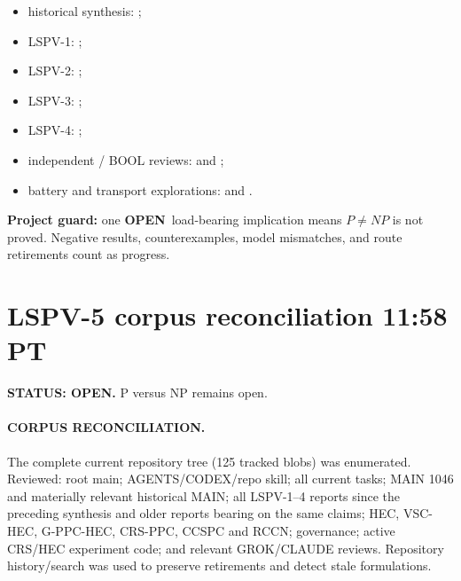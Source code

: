 \documentclass[11pt]{article}
\newcommand{\statusopen}{\textcolor{openstatus}{\textbf{OPEN}}}
\begin{document}
\begin{itemize}
  \item historical synthesis:
    ;
  \item LSPV-1:
    ;
  \item LSPV-2:
    ;
  \item LSPV-3:
    ;
  \item LSPV-4:
    ;
  \item independent / BOOL reviews:
     and ;
  \item battery and transport explorations:
     and
    .
\end{itemize}

\vfill
\begin{center}
\small
\textbf{Project guard:} one \statusopen\ load-bearing implication means \(P\neq NP\) is not proved.
Negative results, counterexamples, model mismatches, and route retirements count as progress.
\end{center}


\section{LSPV-5 corpus reconciliation 11:58 PT}
\textbf{STATUS: OPEN.} P versus NP remains open.

\paragraph{CORPUS RECONCILIATION.} The complete current repository tree (125 tracked blobs) was enumerated. Reviewed: root main; AGENTS/CODEX/repo skill; all current tasks; MAIN 1046 and materially relevant historical MAIN; all LSPV-1--4 reports since the preceding synthesis and older reports bearing on the same claims; HEC, VSC-HEC, G-PPC-HEC, CRS-PPC, CCSPC and RCCN; governance; active CRS/HEC experiment code; and relevant GROK/CLAUDE reviews. Repository history/search was used to preserve retirements and detect stale formulations.
\end{document}
